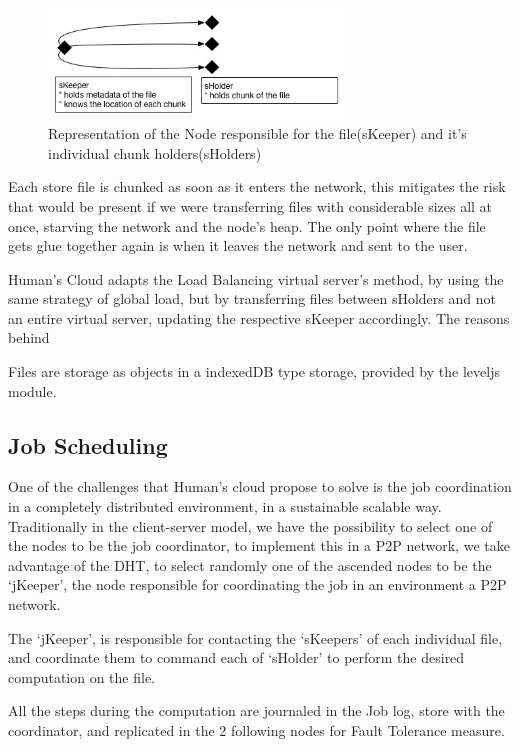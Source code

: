 \documentclass{./llncs2e/llncs}
\begin{document}
\begin{figure}[h!]
  \centering
  \includegraphics[width=0.7\textwidth]{img/skeepersholder.jpg}
  \caption{Representation of the Node responsible for the file(sKeeper) and it's individual chunk holders(sHolders)}
  \label{fig:skeepersholder}
\end{figure}

Each store file is chunked as soon as it enters the network, this mitigates the risk that would be present if we were transferring files with considerable sizes all at once, starving the network and the node's heap. The only point where the file gets glue together again is when it leaves the network and sent to the user.

Human's Cloud adapts the Load Balancing virtual server's method, by using the same strategy of global load, but by transferring files between sHolders and not an entire virtual server, updating the respective sKeeper accordingly. The reasons behind

Files are storage as objects in a indexedDB type storage, provided by the leveljs module. 

\subsection{Job Scheduling}

One of the challenges that Human's cloud propose to solve is the job coordination in a completely distributed environment, in a sustainable scalable way. Traditionally in the client-server model, we have the possibility to select one of the nodes to be the job coordinator, to implement this in a P2P network, we take advantage of the DHT, to select randomly one of the ascended nodes to be the `jKeeper', the node responsible for coordinating the job in an environment a P2P network.

The `jKeeper', is responsible for contacting the `sKeepers' of each individual file, and coordinate them to command each of `sHolder' to perform the desired computation on the file.

All the steps during the computation are journaled in the Job log, store with the coordinator, and replicated in the 2 following nodes for Fault Tolerance measure.
\end{document}
